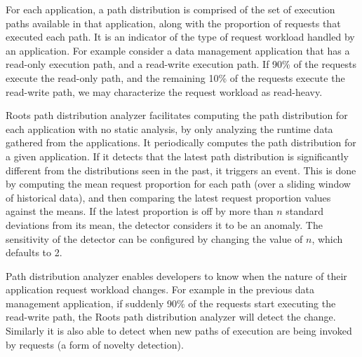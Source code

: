 For each application,
a path distribution is comprised of the set of execution paths available in
that application, along with the proportion of requests that executed each path.
It is an indicator of the type of request workload handled by an application.
For example consider a data management application that has a read-only execution path, and a read-write 
execution path. If 90\% of the requests execute the read-only path, and the remaining 10\% of the requests
execute the read-write path, we may characterize the request workload as read-heavy.

%
 
Roots path distribution analyzer facilitates computing the path distribution for each application
with no static analysis, by only analyzing the runtime data gathered from the applications.
It periodically computes the path distribution for a given application.
If it detects that the latest path distribution is significantly different from the distributions seen in the 
past, it triggers an event. This is done by computing the mean request proportion for each path
(over a sliding window of historical data),
and then comparing the latest request proportion values against the means. If the latest proportion
is off by more than $n$ standard deviations from its mean, the detector considers it to be an
anomaly. The sensitivity of the detector can be configured by changing the value of $n$, which
defaults to 2. 

Path distribution analyzer enables developers to know when the nature of their application request
workload changes. For example in the previous data management application, if suddenly 90\%
of the requests start executing the read-write path, the Roots path distribution analyzer will
detect the change. Similarly it is also able to detect when new paths of execution
are being invoked by requests (a form of novelty detection).

